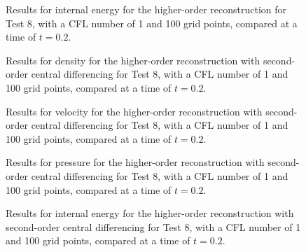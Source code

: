\begin{figure}
	\caption[Results for internal energy for the higher-order reconstruction for Test 8, with a CFL number of 1 and 100 grid points, compared at a time of $t=0.2$.]{Results for internal energy for the higher-order reconstruction for Test 8, with a CFL number of 1 and 100 grid points, compared at a time of $t=0.2$.}
	\label{fig:Test8HORenergy}
\end{figure}

\begin{figure}
	\caption[Results for density for the higher-order reconstruction with second-order central differencing for Test 8, with a CFL number of 1 and 100 grid points, compared at a time of $t=0.2$.]{Results for density for the higher-order reconstruction with second-order central differencing for Test 8, with a CFL number of 1 and 100 grid points, compared at a time of $t=0.2$.}
	\label{fig:Test8HORCD2density}
\end{figure}

\begin{figure}
	\caption[Results for velocity for the higher-order reconstruction with second-order central differencing for Test 8, with a CFL number of 1 and 100 grid points, compared at a time of $t=0.2$.]{Results for velocity for the higher-order reconstruction with second-order central differencing for Test 8, with a CFL number of 1 and 100 grid points, compared at a time of $t=0.2$.}
	\label{fig:Test8HORCD2velocity}
\end{figure}

\begin{figure}
	\caption[Results for pressure for the higher-order reconstruction with second-order central differencing for Test 8, with a CFL number of 1 and 100 grid points, compared at a time of $t=0.2$.]{Results for pressure for the higher-order reconstruction with second-order central differencing for Test 8, with a CFL number of 1 and 100 grid points, compared at a time of $t=0.2$.}
	\label{fig:Test8HORCD2pressure}
\end{figure}

\begin{figure}
	\caption[Results for internal energy for the higher-order reconstruction with second-order central differencing for Test 8, with a CFL number of 1 and 100 grid points, compared at a time of $t=0.2$.]{Results for internal energy for the higher-order reconstruction with second-order central differencing for Test 8, with a CFL number of 1 and 100 grid points, compared at a time of $t=0.2$.}
	\label{fig:Test8HORCD2energy}
\end{figure}

